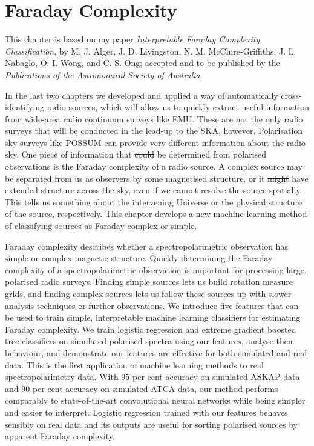 \documentclass[11pt, a4paper]{book}
\makeatletter
\newcounter{savesection}
\newcounter{apdxsection}
\newcommand\unappendix{\par
  \setcounter{apdxsection}{\value{section}}%
  \setcounter{section}{\value{savesection}}%
  \setcounter{subsection}{0}%
  \gdef\thesection{\thechapter.\@arabic\c@section}} %
\providecommand{\DIFaddtex}[1]{{\protect\color{blue}\uwave{#1}}} %
\providecommand{\DIFdeltex}[1]{{\protect\color{red}\sout{#1}}}                      %
\providecommand{\DIFaddbegin}{} %
\providecommand{\DIFaddend}{} %
\providecommand{\DIFdelbegin}{} %
\providecommand{\DIFdelend}{} %
\providecommand{\DIFadd}[1]{\texorpdfstring{\DIFaddtex{#1}}{#1}} %
\providecommand{\DIFdel}[1]{\texorpdfstring{\DIFdeltex{#1}}{}} %
\newcommand{\DIFscaledelfig}{0.5}
\newlength{\DIFdelgraphicswidth} %
\newlength{\DIFdelgraphicsheight} %
\newcommand{\DIFaddincludegraphics}[2][]{{\color{blue}\fbox{\DIFOincludegraphics[#1]{#2}}}} %
\newcommand{\DIFdelincludegraphics}[2][]{%
\sbox{\DIFdelgraphicsbox}{\DIFOincludegraphics[#1]{#2}}%
\settoboxwidth{\DIFdelgraphicswidth}{\DIFdelgraphicsbox} %
\settoboxtotalheight{\DIFdelgraphicsheight}{\DIFdelgraphicsbox} %
\scalebox{\DIFscaledelfig}{%
\parbox[b]{\DIFdelgraphicswidth}{\usebox{\DIFdelgraphicsbox}\\[-\baselineskip] \rule{\DIFdelgraphicswidth}{0em}}\llap{\resizebox{\DIFdelgraphicswidth}{\DIFdelgraphicsheight}{%
\setlength{\unitlength}{\DIFdelgraphicswidth}%
\begin{picture}(1,1)%
\thicklines\linethickness{2pt} %
{\color[rgb]{1,0,0}\put(0,0){\framebox(1,1){}}}%
{\color[rgb]{1,0,0}\put(0,0){\line( 1,1){1}}}%
{\color[rgb]{1,0,0}\put(0,1){\line(1,-1){1}}}%
\end{picture}%
}\hspace*{3pt}}} %
} %
\DeclareRobustCommand{\DIFaddbegin}{\DIFOaddbegin \let\includegraphics\DIFaddincludegraphics} %
\DeclareRobustCommand{\DIFaddend}{\DIFOaddend \let\includegraphics\DIFOincludegraphics} %
\DeclareRobustCommand{\DIFdelbegin}{\DIFOdelbegin \let\includegraphics\DIFdelincludegraphics} %
\DeclareRobustCommand{\DIFdelend}{\DIFOaddend \let\includegraphics\DIFOincludegraphics} %
\makeatother
\begin{document}
\unappendix

\DIFaddend %
\chapter{Faraday Complexity}
\label{cha:faraday}

This chapter is based on my paper \emph{Interpretable Faraday Complexity Classification}, by M. J. Alger, J. D. Livingston, N. M. McClure-Griffiths, J. L. Nabaglo, O. I. Wong, and C. S. Ong; accepted and to be published by the \emph{Publications of the Astronomical Society of Australia}.

In the last two chapters we developed and applied a way of automatically cross-identifying radio sources, which will allow us to quickly extract useful information from wide-area radio continuum surveys like EMU. These are not the only radio surveys that will be conducted in the lead-up to the SKA, however. Polarisation sky surveys like POSSUM can provide very different information about the radio sky. One piece of information that \DIFdelbegin \DIFdel{could }\DIFdelend \DIFaddbegin \DIFadd{can }\DIFaddend be determined from polarised observations is the Faraday complexity of a radio source. A complex source may be separated from us as observers by some magnetised structure, or it \DIFdelbegin \DIFdel{might }\DIFdelend \DIFaddbegin \DIFadd{may }\DIFaddend have extended structure across the sky, even if we cannot resolve the source spatially. This tells us something about the intervening Universe or the physical structure of the source, respectively. This chapter develops a new machine learning method of classifying sources as Faraday complex or simple.

Faraday complexity describes whether a spectropolarimetric observation has simple or complex magnetic structure. Quickly determining the Faraday complexity of a spectropolarimetric observation is important for processing large, polarised radio surveys. Finding simple sources lets us build rotation measure grids, and finding complex sources lets us follow these sources up with slower analysis techniques or further observations. We introduce five features that can be used to train simple, interpretable machine learning classifiers for estimating Faraday complexity. We train logistic regression and extreme gradient boosted tree classifiers on simulated polarised spectra using our features, analyse their behaviour, and demonstrate \DIFaddbegin \DIFadd{that }\DIFaddend our features are effective for both simulated and real data. This is the first application of machine learning methods to real spectropolarimetry data. With 95 per cent accuracy on simulated ASKAP data and 90 per cent accuracy on simulated ATCA data, our method performs comparably to state-of-the-art convolutional neural networks while being simpler and easier to interpret. Logistic regression trained with our features behaves sensibly on real data and its outputs are useful for sorting polarised sources by apparent Faraday complexity.
\end{document}

